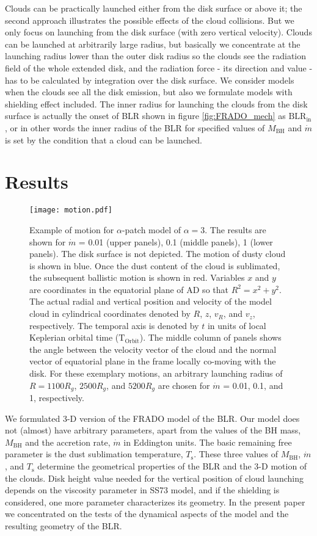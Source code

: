 \documentclass[twocolumn]{aastex62}
\begin{document}
Clouds can be practically launched either from the disk surface or above it; the second approach illustrates the possible effects of the cloud collisions. But we only focus on launching from the disk surface (with zero vertical velocity). Clouds can be launched at arbitrarily large radius, but basically we concentrate at the launching radius lower than the outer disk radius so the clouds see the radiation field of the whole extended disk, and the radiation force - its direction and value - has to be calculated by integration over the disk surface. We consider models when the clouds see all the disk emission, but also we formulate models with shielding effect included. The inner radius for launching the clouds from the disk surface is actually the onset of BLR shown in figure \ref{fig:FRADO_mech} as $\mathrm{BLR}_{\mathrm{in}}$, or in other words the inner radius of the BLR for specified values of $M_{\mathrm{BH}}$ and $\dot m$ is set by the condition that a cloud can be launched.

\section{Results}\label{sec:results}

\begin{figure*}
	\centering
	\texttt{[image: motion.pdf]}
	\caption{Example of motion for $\alpha$-patch model of $\alpha=3$. The results are shown for $\dot m$ = 0.01 (upper panels), 0.1 (middle panels), 1 (lower panels). The disk surface is not depicted. The motion of dusty cloud is shown in blue. Once the dust content of the cloud is sublimated, the subsequent ballistic motion is shown in red. Variables $x$ and $y$ are coordinates in the equatorial plane of AD so that $R^2 = x^2 + y^2$. The actual radial and vertical position and velocity of the model cloud in cylindrical coordinates denoted by $R$, $z$, $v_{R}$, and $v_{z}$, respectively. The temporal axis is denoted by $t$ in units of local Keplerian orbital time ($\mathrm{T}_{\mathrm{Orbit}}$). The middle column of panels shows the angle between the velocity vector of the cloud and the normal vector of equatorial plane in the frame locally co-moving with the disk. For these exemplary motions, an arbitrary launching radius of $R = 1100 R_g$, $2500 R_g$, and $5200 R_g$ are chosen for $\dot m$ = 0.01, 0.1, and 1, respectively.}
	\label{fig:single_cloud}
\end{figure*}

We formulated 3-D version of the FRADO model of the BLR. Our model does not (almost) have arbitrary parameters, apart from the values of the BH mass, $M_{\mathrm{BH}}$ and the accretion rate, $\dot m$ in Eddington units. The basic remaining free parameter is the dust sublimation temperature, $T_{\mathrm{s}}$. These three values of $M_{\mathrm{BH}}$, $\dot m$, and $T_{\mathrm{s}}$ determine the geometrical properties of the BLR and the 3-D motion of the clouds. Disk height value needed for the vertical position of cloud launching depends on the viscosity parameter in SS73 model, and if the shielding is considered, one more parameter characterizes its geometry. In the present paper we concentrated on the tests of the dynamical aspects of the model and the resulting geometry of the BLR.
\end{document}
